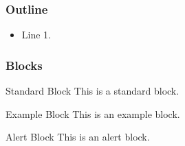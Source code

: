 \documentclass[11 pt,t]{beamer}
\begin{document}




\begin{frame}
\frametitle{Outline}

\begin{itemize}
    \item Line 1.
\end{itemize}


\end{frame}


\begin{frame}
\frametitle{Blocks}

\begin{block}{Standard Block}
    This is a standard block.
\end{block}

\begin{exampleblock}{Example Block}
    This is an example block.
\end{exampleblock}

\begin{alertblock}{Alert Block}
    This is an alert block.
\end{alertblock}



\end{frame}
\end{document}
